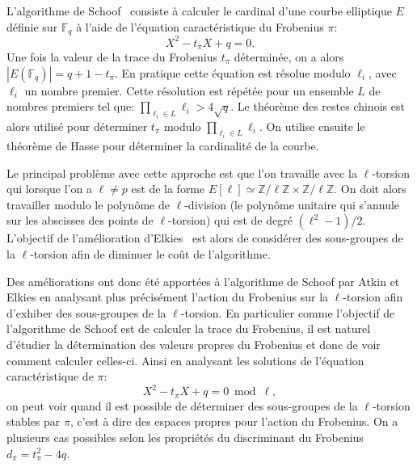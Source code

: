 \documentclass[10pt,a4paper]{book}
\theoremstyle{plain}
\theoremstyle{definition}
\theoremstyle{definition}
\theoremstyle{definition}
\theoremstyle{definition}
\theoremstyle{definition}
\theoremstyle{remark}
\theoremstyle{remark}
\theoremstyle{definition}
\begin{document}
L'algorithme de Schoof~\cite{Schoof85} consiste à calculer le cardinal d'une courbe elliptique $E$ définie sur $\mathbb{F}_q$ à l'aide de l'équation caractéristique du Frobenius $\pi$:
\begin{equation*}
X^2-t_{\pi}X+q=0.
\end{equation*}
Une fois la valeur de la trace du Frobenius $t_{\pi}$ déterminée, on a alors $|E(\mathbb{F}_q)|=q+1-t_{\pi}$. En pratique cette équation est résolue modulo $\ell_i$, avec $\ell_i$ un nombre premier. Cette résolution est répétée pour un ensemble $L$ de nombres premiers tel que: $\prod_{\ell_i \in L}\ell_i>4 \sqrt{q}$. Le théorème des restes chinois est alors utilisé pour déterminer $t_{\pi}$ modulo $\prod_{\ell_i \in L}\ell_i$. On utilise ensuite le théorème de Hasse pour déterminer la cardinalité de la courbe.

Le principal problème avec cette approche est que l'on travaille avec la 
$\ell$-torsion qui lorsque l'on a $\ell \neq p$ est de la forme $E[\ell] 
\simeq \mathbb{Z}/\ell \mathbb{Z} \times \mathbb{Z}/\ell \mathbb{Z}$. On doit 
alors travailler modulo le polynôme de $\ell$-division (le polynôme unitaire 
qui s'annule sur les abscisses des points de $\ell$-torsion) qui est de degré 
$(\ell^2-1)/2$. L'objectif de l'amélioration d'Elkies~\cite{Elkies91} est alors de considérer des sous-groupes de la $\ell$-torsion afin de diminuer le coût de l'algorithme.

Des améliorations ont donc été apportées à l'algorithme de Schoof par Atkin et 
Elkies en analysant plus précisément l'action du Frobenius sur la 
$\ell$-torsion afin d'exhiber des sous-groupes de la $\ell$-torsion. En 
particulier comme l'objectif de l'algorithme de Schoof est de calculer la trace
du Frobenius, il est naturel d'étudier la détermination des valeurs propres du
Frobenius et donc de voir comment calculer celles-ci. Ainsi en analysant les 
solutions de l'équation caractéristique de $\pi$:
\begin{equation*}
X^2-t_{\pi}X+q = 0 \bmod \ell,
\end{equation*} 
on peut voir quand il est possible de déterminer des sous-groupes de la 
$\ell$-torsion stables par $\pi$, c'est à dire des espaces propres pour 
l'action du Frobenius.
On a plusieurs cas possibles selon les propriétés du discriminant du Frobenius 
$d_{\pi}=t_{\pi}^2-4q$.
\end{document}
